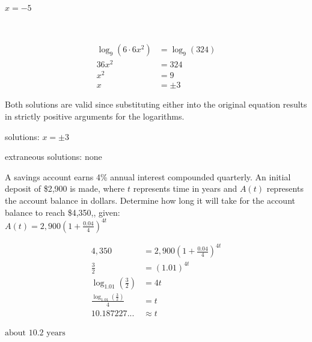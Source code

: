 \documentclass[addpoints]{exam}
\begin{document}
\begin{questions}
\begin{solution}
 \(\boxed{x = -5}\)
\end{solution}
\newpage

\\
\begin{solution}
\[\begin{aligned} \log_{9}(6 \cdot 6x^2) &= \log_{9}(324) \\ 36x^2 &= 324 \\ x^2 &= 9 \\ x &= \pm 3 \end{aligned}\]

 Both solutions are valid since substituting either into the original equation results in strictly positive arguments for the logarithms. 

solutions: \(\boxed{ x = \pm 3 }\)

extraneous solutions: \(\boxed{ \text{none} }\)
\end{solution}

\question[5]
A savings account earns 4\% annual interest compounded quarterly. An initial deposit of \$2,900 is made, where $t$ represents time in years and $A(t)$ represents the account balance in dollars. Determine how long it will take for the account balance to reach \$4,350,, given:\\

\(\displaystyle{ \displaystyle{A(t) = 2,900 \left( 1 + \frac{0.04}{4} \right)^{4t}} }\) 
\begin{solution}
\[\begin{aligned} 4,350 &= 2,900 \left( 1 + \frac{0.04}{4} \right)^{4t} \\ \frac{3}{2} &= (1.01)^{4t} \\ \log_{1.01}\left(\frac{3}{2}\right) &= 4t \\ \frac{\log_{1.01}\left(\frac{3}{2}\right)}{4} &= t \\ 10.187227... &\approx t \end{aligned}\]

\(\boxed{\text{about } 10.2 \text{ years}}\)
\end{solution}
\answerline
\newpage


\end{questions}
\end{document}
